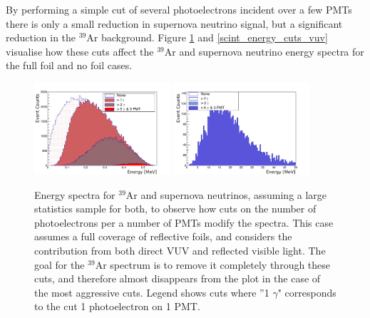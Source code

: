 \documentclass[a4paper]{article}
\begin{document}
By performing a simple cut of several photoelectrons incident over a few PMTs there is only a small reduction in supernova neutrino signal, but a significant reduction in the $^{39}$Ar background. Figure \ref{scint_energy_cuts} and \ref{scint_energy_cuts_vuv} visualise how these cuts affect the $^{39}$Ar and supernova neutrino energy spectra for the full foil and no foil cases.

\begin{figure}[H]
\center
\includegraphics[width=0.45\textwidth]{ar39_energy_spectrum_60pmts_alllight_labels.pdf}
\includegraphics[width=0.45\textwidth]{sn_energy_spectrum_60pmts_alllight_labels.pdf}
\caption{Energy spectra for $^{39}$Ar and supernova neutrinos, assuming a large statistics sample for both, to observe how cuts on the number of photoelectrons per a number of PMTs modify the spectra. This case assumes a full coverage of reflective foils, and considers the contribution from both direct VUV and reflected visible light. The goal for the $^{39}$Ar spectrum is to remove it completely through these cuts, and therefore almost disappears from the plot in the case of the most aggressive cuts. Legend shows cuts where ''1 $\gamma$" corresponds to the cut 1 photoelectron on 1 PMT.}\label{scint_energy_cuts}
\end{figure}
\end{document}
